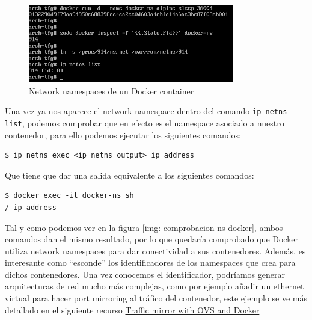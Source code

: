 \documentclass[12pt]{article}
\begin{document}
	\begin{figure}[h!]
		\begin{center}
			\includegraphics[width=0.8\textwidth]{img/docker_ns3.png}
			\caption{Network namespaces de un Docker container}
		\end{center}
	\end{figure}

	\noindent Una vez ya nos aparece el network namespace dentro del comando \texttt{ip netns list}, podemos comprobar que en efecto es el namespace asociado a nuestro contenedor, para ello podemos ejecutar los siguientes comandos:
	
	\begin{verbatim}
$ ip netns exec <ip netns output> ip address
	\end{verbatim}

	\noindent Que tiene que dar una salida equivalente a los siguientes comandos:
	
	\begin{verbatim}
$ docker exec -it docker-ns sh
/ ip address
	\end{verbatim}

	\noindent Tal y como podemos ver en la figura \ref{img: comprobacion ns docker}, ambos comandos dan el mismo resultado, por lo que quedaría comprobado que Docker utiliza network namespaces para dar conectividad a sus contenedores. Además, es interesante como ``esconde'' los identificadores de los namespaces que crea para dichos contenedores. Una vez conocemos el identificador, podríamos generar arquitecturas de red mucho más complejas, como por ejemplo añadir un ethernet virtual para hacer port mirroring al tráfico del contenedor, este ejemplo se ve más detallado en el siguiente recurso \href{https://arthurchiao.art/blog/traffic-mirror-with-ovs/}{Traffic mirror with OVS and Docker}

	\pagebreak
\end{document}

